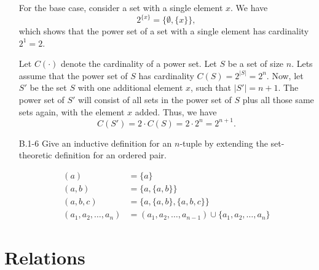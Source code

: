 \begin{enumerate}
\begin{framed}
For the base case, consider a set with a single element $x$. We have
\[
  2^{\{x\}} = \{\emptyset, \{x\}\},
\]
which shows that the power set of a set with a single element has cardinality
$2^1 = 2$.

Let $C(\cdot)$ denote the cardinality of a power set. Let $S$ be a set of size
$n$. Lets assume that the power set of $S$ has cardinality
$C(S) = 2^{|S|} = 2^n$. Now, let $S'$ be the set $S$ with one additional element
$x$, such that $|S'| = n + 1$. The power set of $S'$ will consist of all sets
in the power set of $S$ plus all those same sets again, with the element $x$
added. Thus, we have
\[
  C(S') = 2 \cdot C(S) = 2 \cdot 2^n = 2^{n + 1}.
\]
\end{framed}

\item[B.1{-}6]{Give an inductive definition for an $n$-tuple by extending the
set-theoretic definition for an ordered pair.}

\begin{framed}
\begin{equation*}
\begin{aligned}
  (a) &= \{a\}\\
  (a, b) &= \{a, \{a, b\}\}\\
  (a, b, c) &= \{a, \{a, b\}, \{a, b, c\}\}\\
  (a_1, a_2, \dots, a_n) &= (a_1, a_2, \dots, a_{n - 1}) \cup \{a_1, a_2, \dots, a_n\}
\end{aligned}
\end{equation*}
\end{framed}

\end{enumerate}

\newpage

\section{Relations}

